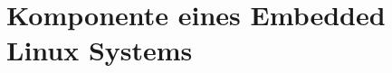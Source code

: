 \section{Komponente eines Embedded Linux Systems}
\label{cha:tech_grund:sec:Komponente_eines_Emb_Lin_Sys}